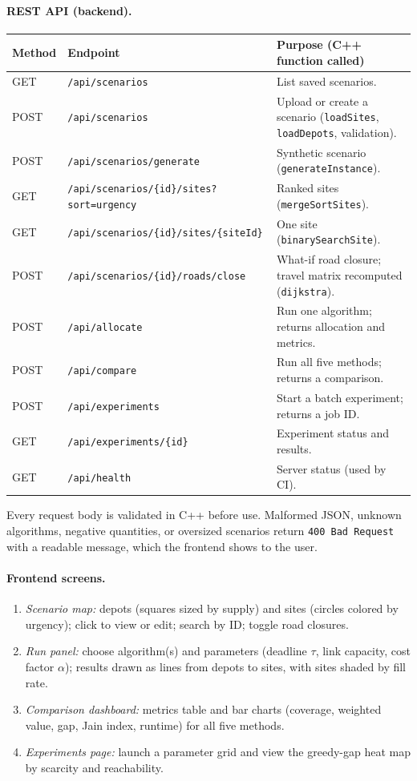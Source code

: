 \documentclass[11pt]{article}
\begin{document}
\paragraph{REST API (backend).}
{\small
\begin{xltabular}{\textwidth}{@{}l l X@{}}
\toprule
\textbf{Method} & \textbf{Endpoint} & \textbf{Purpose (C++ function called)}\\
\midrule
\endhead
GET  & \texttt{/api/scenarios} & List saved scenarios.\\
POST & \texttt{/api/scenarios} & Upload or create a scenario (\texttt{loadSites}, \texttt{loadDepots}, validation).\\
POST & \texttt{/api/scenarios/generate} & Synthetic scenario (\texttt{generateInstance}).\\
GET  & \texttt{/api/scenarios/\{id\}/sites?sort=urgency} & Ranked sites (\texttt{mergeSortSites}).\\
GET  & \texttt{/api/scenarios/\{id\}/sites/\{siteId\}} & One site (\texttt{binarySearchSite}).\\
POST & \texttt{/api/scenarios/\{id\}/roads/close} & What-if road closure; travel matrix recomputed (\texttt{dijkstra}).\\
POST & \texttt{/api/allocate} & Run one algorithm; returns allocation and metrics.\\
POST & \texttt{/api/compare} & Run all five methods; returns a comparison.\\
POST & \texttt{/api/experiments} & Start a batch experiment; returns a job ID.\\
GET  & \texttt{/api/experiments/\{id\}} & Experiment status and results.\\
GET  & \texttt{/api/health} & Server status (used by CI).\\
\bottomrule
\end{xltabular}}
Every request body is validated in C++ before use. Malformed JSON, unknown
algorithms, negative quantities, or oversized scenarios return
\texttt{400 Bad Request} with a readable message, which the frontend shows to
the user.

\paragraph{Frontend screens.}
\begin{enumerate}
  \item \emph{Scenario map:} depots (squares sized by supply) and sites
        (circles colored by urgency); click to view or edit; search by ID;
        toggle road closures.
  \item \emph{Run panel:} choose algorithm(s) and parameters (deadline
        $\tau$, link capacity, cost factor $\alpha$); results drawn as lines
        from depots to sites, with sites shaded by fill rate.
  \item \emph{Comparison dashboard:} metrics table and bar charts (coverage,
        weighted value, gap, Jain index, runtime) for all five methods.
  \item \emph{Experiments page:} launch a parameter grid and view the
        greedy-gap heat map by scarcity and reachability.
\end{enumerate}
\end{document}
